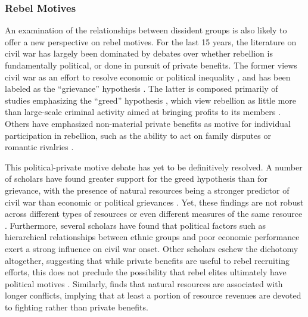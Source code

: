 \subsubsection{Rebel Motives}

An examination of the relationships between dissident groups is also likely to offer a new perspective on rebel motives. For the last 15 years, the literature on civil war has largely been dominated by debates over whether rebellion is fundamentally political, or done in pursuit of private benefits. The former views civil war as an effort to resolve economic or political inequality \citep{gurr70,Wood2003,Cederman2010}, and has been labeled as the ``grievance'' hypothesis \citep{Collier2004}. The latter is composed primarily of studies emphasizing the ``greed'' hypothesis \citep{Collier2004}, which view rebellion as little more than large-scale criminal activity aimed at bringing profits to its members \citep{mueller00,Lujala2005,Ross2004e}. Others have emphasized non-material private benefits as motive for individual participation in rebellion, such as the ability to act on family disputes or romantic rivalries \citep{Kalyvas2006}.

This political-private motive debate has yet to be definitively resolved. A number of scholars have found greater support for the greed hypothesis than for grievance, with the presence of natural resources being a stronger predictor of civil war than economic or political grievances \citep{Collier2004}. Yet, these findings are not robust across different types of resources or even different measures of the same resource \citep{Dixon2009a}. Furthermore, several scholars have found that political factors such as hierarchical relationships between ethnic groups \citep{Cederman2010} and poor economic performance \citep{Miguel2004a} exert a strong influence on civil war onset. Other scholars eschew the dichotomy altogether, suggesting that while private benefits are useful to rebel recruiting efforts, this does not preclude the possibility that rebel elites ultimately have political motives \citep{Lichbach1995,Weinstein2007}. Similarly, \citet{Lujala2010} finds that natural resources are associated with longer conflicts, implying that at least a portion of resource revenues are devoted to fighting rather than private benefits.


